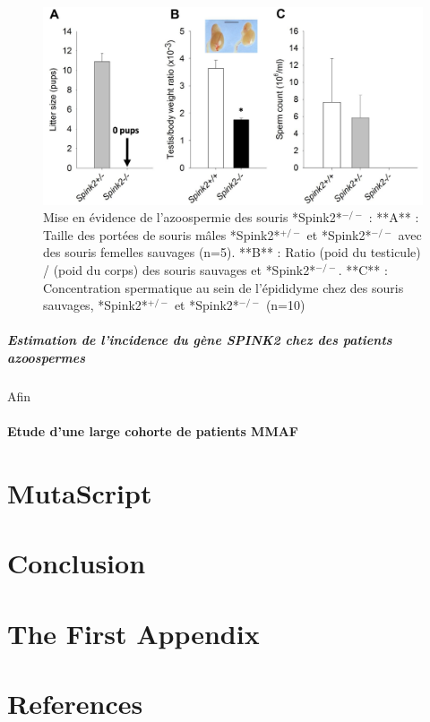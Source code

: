 \documentclass[12pt,twoside]{reedthesis}
\theoremstyle{definition}
\theoremstyle{definition}
\theoremstyle{remark}
\begin{document}
  \begin{figure}
  
  {\centering \includegraphics[scale=.35]{figure/spink2_ko_mice_fertility} 
  
  }
  
  \caption[Mise en évidence de l'azoospermie des souris *Spink2*$^{-/-}$]{Mise en évidence de l'azoospermie des souris *Spink2*$^{-/-}$ : **A** : Taille des portées de souris mâles *Spink2*$^{+/-}$ et *Spink2*$^{-/-}$ avec des souris femelles sauvages (n=5). **B** : Ratio (poid du testicule) / (poid du corps) des souris sauvages et *Spink2*$^{-/-}$. **C** : Concentration spermatique au sein de l'épididyme chez des souris sauvages, *Spink2*$^{+/-}$ et *Spink2*$^{-/-}$ (n=10)}\label{fig:spink2komice}
  \end{figure}
  
  \paragraph{\texorpdfstring{Estimation de l'incidence du gène
  \emph{SPINK2} chez des patients
  azoospermes}{Estimation de l'incidence du gène SPINK2 chez des patients azoospermes}}\label{estimation-de-lincidence-du-gene-spink2-chez-des-patients-azoospermes}
  
  Afin
  
  \subsubsection{Etude d'une large cohorte de patients
  MMAF}\label{etude-dune-large-cohorte-de-patients-mmaf}
  
  \chapter{MutaScript}\label{mutascript}
  
  \chapter*{Conclusion}\label{conclusion}
  
  \chapter{The First Appendix}\label{the-first-appendix}
  
  \chapter*{References}\label{references}


\end{document}
